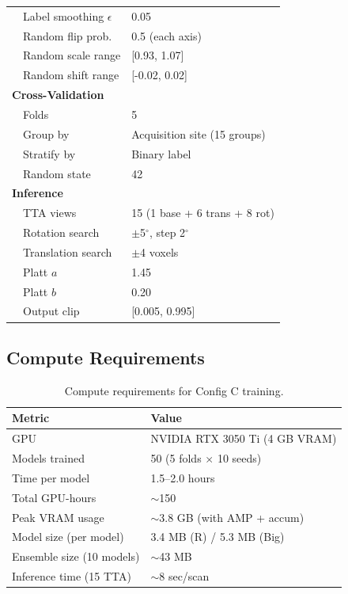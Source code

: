 \begin{table}[H]
\begin{tabular}{ll}
\ \ Label smoothing $\epsilon$ & 0.05 \\
\ \ Random flip prob. & 0.5 (each axis) \\
\ \ Random scale range & [0.93, 1.07] \\
\ \ Random shift range & [-0.02, 0.02] \\
\midrule
\textbf{Cross-Validation} & \\
\ \ Folds & 5 \\
\ \ Group by & Acquisition site (15 groups) \\
\ \ Stratify by & Binary label \\
\ \ Random state & 42 \\
\midrule
\textbf{Inference} & \\
\ \ TTA views & 15 (1 base + 6 trans + 8 rot) \\
\ \ Rotation search & $\pm$5$^\circ$, step 2$^\circ$ \\
\ \ Translation search & $\pm$4 voxels \\
\ \ Platt $a$ & 1.45 \\
\ \ Platt $b$ & 0.20 \\
\ \ Output clip & [0.005, 0.995] \\
\bottomrule
\end{tabular}
\end{table}

\subsection{Compute Requirements}
\label{app:compute}

\begin{table}[H]
\centering
\caption{Compute requirements for Config C training.}
\label{tab:compute}
\begin{tabular}{ll}
\toprule
\textbf{Metric} & \textbf{Value} \\
\midrule
GPU & NVIDIA RTX 3050 Ti (4 GB VRAM) \\
Models trained & 50 (5 folds $\times$ 10 seeds) \\
Time per model & 1.5--2.0 hours \\
Total GPU-hours & $\sim$150 \\
Peak VRAM usage & $\sim$3.8 GB (with AMP + accum) \\
Model size (per model) & 3.4 MB (R) / 5.3 MB (Big) \\
Ensemble size (10 models) & $\sim$43 MB \\
Inference time (15 TTA) & $\sim$8 sec/scan \\
\bottomrule
\end{tabular}
\end{table}

